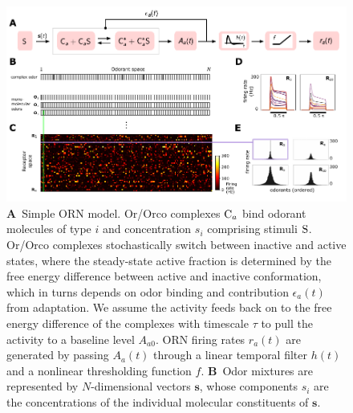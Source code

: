 \documentclass[9pt,twocolumn,twoside]{pnas-new}
\begin{document}
\begin{figure}[!tb]
	\centering
	\begin{subfigure}[t]{\linewidth}
		\label{fig:tuning_curves_a}
	\end{subfigure}
	\begin{subfigure}[t]{0\linewidth}
		\label{fig:tuning_curves_b}
	\end{subfigure}
	\begin{subfigure}[t]{0\linewidth}
		\label{fig:tuning_curves_c}
	\end{subfigure}
	\begin{subfigure}[t]{0\linewidth}
		\label{fig:tuning_curves_d}
	\end{subfigure}
	\begin{subfigure}[t]{0\linewidth}
		\label{fig:tuning_curves_e}
	\end{subfigure}
	\includegraphics[width=\linewidth]{figures/1_tuning_curves}
	\caption{\footnotesize{
		\textbf{A}~Simple ORN model. Or/Orco complexes $\textup{C}_a$ bind odorant molecules of type $i$ and concentration $s_i$ comprising stimuli $\textup{S}$. Or/Orco complexes stochastically switch between inactive and active states, where the steady-state active fraction is determined by the free energy difference between active and inactive conformation, which in turns depends on odor binding and contribution $\epsilon_a(t)$ from adaptation. We assume the activity feeds back on to the free energy difference of the complexes with timescale $\tau$ to pull the activity to a baseline level $A_{a0}$. ORN firing rates $r_a(t)$ are generated by passing $A_a(t)$ through a linear temporal filter $h(t)$ and a nonlinear thresholding function $f$. 
		\textbf{B}~Odor mixtures are represented by $N$-dimensional vectors $\mathbf s$, whose components $s_i$ are the concentrations of  the individual molecular constituents  of $\mathbf s$. 
}}
\end{figure}
\end{document}
